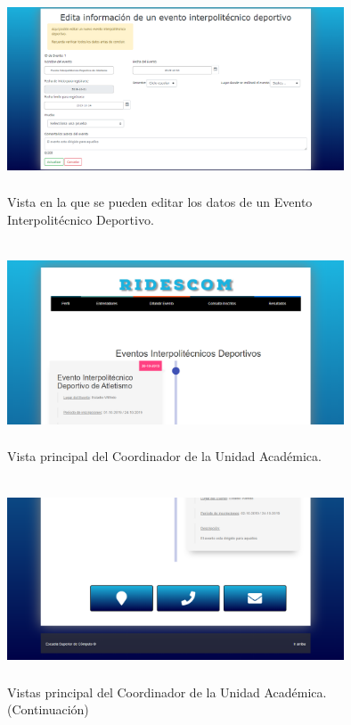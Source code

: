 		\begin{figure} [hbt!]
			\centering
			\includegraphics[width=10cm, height=6cm]{Imagenes/Vistas/Vista11_EditarEvento}
			\caption{Vista en la que se pueden editar los datos de un Evento Interpolitécnico Deportivo.}
			\label{VistaEditarEvento}
		\end{figure}
		
		\begin{figure} [hbt!]
			\centering
			\includegraphics[width=10cm, height=6cm]{Imagenes/Vistas/Vista12_PrincipalCoord}
			\caption{Vista principal del Coordinador de la Unidad Académica.}
			\label{VistaPrincipalCoord}
		\end{figure}
		
		\begin{figure} [hbt!]
			\centering
			\includegraphics[width=10cm, height=6cm]{Imagenes/Vistas/Vista13_PrincipalCoord}
			\caption{Vistas principal del Coordinador de la Unidad Académica. (Continuación)}
			\label{VistaPrincipalCoord1}
		\end{figure}
		

